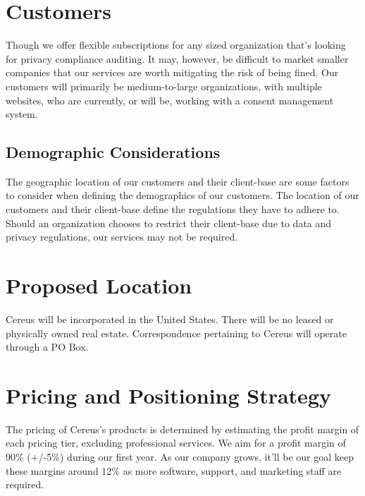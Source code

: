 
\section{Customers}

Though we offer flexible subscriptions for any sized organization that's looking for privacy compliance auditing. It may, however, be difficult to market smaller companies that our services are worth mitigating the risk of being fined. Our customers will primarily be medium-to-large organizations, with multiple websites, who are currently, or will be, working with a consent management system.

\subsection{Demographic Considerations}

The geographic location of our customers and their client-base are some factors to consider when defining the demographics of our customers. The location of our customers and their client-base define the regulations they have to adhere to. Should an organization chooses to restrict their client-base due to data and privacy regulations, our services may not be required.


\section{Proposed Location}

Cereus will be incorporated in the United States. There will be no leased or physically owned real estate. Correspondence pertaining to Cereus will operate through a PO Box. 


\section{Pricing and Positioning Strategy} \label{price.position.strat}

The pricing of Cereus's products is determined by estimating the profit margin of each pricing tier, excluding professional services. We aim for a profit margin of 90\% (+/-5\%) during our first year. As our company grows, it'll be our goal keep these margins around 12\% as more software, support, and marketing staff are required. 


